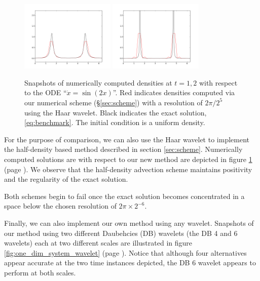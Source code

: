 \documentclass[letterpaper, 12 pt]{amsart}
\begin{document}
\begin{figure}[h!]
  \centering
  \includegraphics[width=0.4\textwidth]{./images/half_density_sqr_t1_00.png}
  \includegraphics[width=0.4\textwidth]{./images/half_density_sqr_t2_00.png}
  \caption{Snapshots of numerically computed densities at $t=1,2$ with respect to the ODE ``$\dot{x} = \sin(2x)$''.
  	Red indicates densities computed via our numerical scheme  (\S \ref{sec:scheme}) with a resolution of $2\pi / 2^5$
  	using the Haar wavelet. Black indicates the exact solution, \eqref{eq:benchmark}.
	The initial condition is a uniform density.}
  \label{fig:half_density_haar}
\end{figure}

For the purpose of comparison, we can also use the Haar wavelet to implement the half-density based method described in section \ref{sec:scheme}.
Numerically computed solutions are with respect to our new method are depicted in figure \ref{fig:half_density_haar} (page \pageref{fig:half_density_haar}).
We observe that the half-density advection scheme maintains positivity and the regularity of the exact solution.

Both schemes begin to fail once the exact solution becomes concentrated in a space below the chosen resolution of $2\pi \times 2^{-6}$.

Finally, we can also implement our own method using any wavelet. Snapshots of our method using two different Daubehcies (DB) wavelets (the DB 4 and 6 wavelets) each at two different scales are illustrated in figure \ref{fig:one_dim_system_wavelet} (page \pageref{fig:one_dim_system_wavelet}). Notice that although four alternatives appear accurate at the two time instances depicted, the DB 6 wavelet appears to perform at both scales. 
\end{document}
